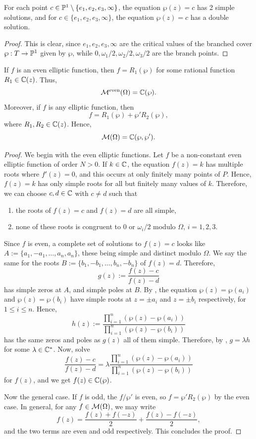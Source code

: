 \documentclass[11pt]{article}
\begin{document}
\begin{cor}[][label=cor:solutions_of_p]
    For each point $c \in \P^1 \setminus \{e_1,e_2,e_3,\infty\}$, the equation $\wp(z)=c$ has 2 simple solutions, and for $c \in \{e_1,e_2,e_3,\infty\}$, the equation $\wp (z) = c$ has a double solution.
\end{cor}

\begin{proof}
    This is clear, since $e_1,e_2,e_3,\infty$ are the critical values of the branched cover $\wp:T \to \P^1$ given by $\wp$, while $0,\omega_1/2,\omega_2/2,\omega_3/2$ are the branch points. 
\end{proof}

\begin{thm}
    If $f$ is an even elliptic function, then $f=R_1(\wp )$ for some rational function $R_1 \in \C(z)$. Thus,
    $$\mc M^{\text{even}}(\Omega) = \C(\wp).$$
    Moreover, if $f$ is any elliptic function, then
    $$f=R_1(\wp) + \wp' R_2(\wp),$$
    where $R_1,R_2 \in \C(z)$. Hence,
    $$\mc M(\Omega) = \C(\wp,\wp').$$
\end{thm}

\begin{proof}
    We begin with the even elliptic functions. Let $f$ be a non-constant even elliptic function of order $N>0$. If $k \in \C$, the equation $f(z)=k$ has multiple roots where $f'(z)=0$, and this occurs at only finitely many points of $P$. Hence, $f(z)=k$ has only simple roots for all but finitely many values of $k$. Therefore, we can choose $c,d \in \C$ with $c \neq d$ such that
    \begin{enumerate}
        \item[(a)] the roots of $f(z)=c$ and $f(z)=d$ are all simple,
        \item[(b)] none of these roots is congruent to $0$ or $\omega_i/2$ modulo $\Omega$, $i=1,2,3$.
    \end{enumerate}
    Since $f$ is even, a complete set of solutions to $f(z)=c$ looks like $A:=\{a_1,-a_1,\dots,a_n,a_n\}$, these being simple and distinct modulo $\Omega$. We say the same for the roots $B:=\{b_1,-b_1,\dots,b_n,-b_n\}$ of $f(z)=d$. Therefore,
    $$g(z):=\frac{f(z)-c}{f(z)-d}$$
    has simple zeros at $A$, and simple poles at $B$. By , the equation $\wp(z) = \wp(a_i)$ and $\wp(z)=\wp(b_i)$ have simple roots at $z = \pm a_i$ and $z = \pm b_i$ respectively, for $1 \leq i \leq n$. Hence,
    $$h(z):= \frac{\prod_{i=1}^n(\wp(z) - \wp(a_i))}{\prod_{i=1}^n(\wp(z)-\wp(b_i))}$$
    has the same zeros and poles as $g(z)$ all of them simple. Therefore, by , $g=\lambda h$ for some $\lambda \in \C^*$. Now, solve
    $$\frac{f(z)-c}{f(z)-d}=\lambda \frac{\prod_{i=1}^n(\wp(z)-\wp(a_i))}{\prod_{i=1}^n(\wp(z)-\wp(b_i))}$$
    for $f(z)$, and we get $f(z) \in \C(\wp)$.

    Now the general case. If $f$ is odd, the $f/\wp'$ is even, so $f=\wp'R_2(\wp)$ by the even case. In general, for any $f \in \mc M(\Omega)$, we may write
    $$f(z) = \frac{f(z) + f(-z)}{2}+\frac{f(z)-f(-z)}{2},$$
    and the two terms are even and odd respectively. This concludes the proof.
\end{proof}
\end{document}
